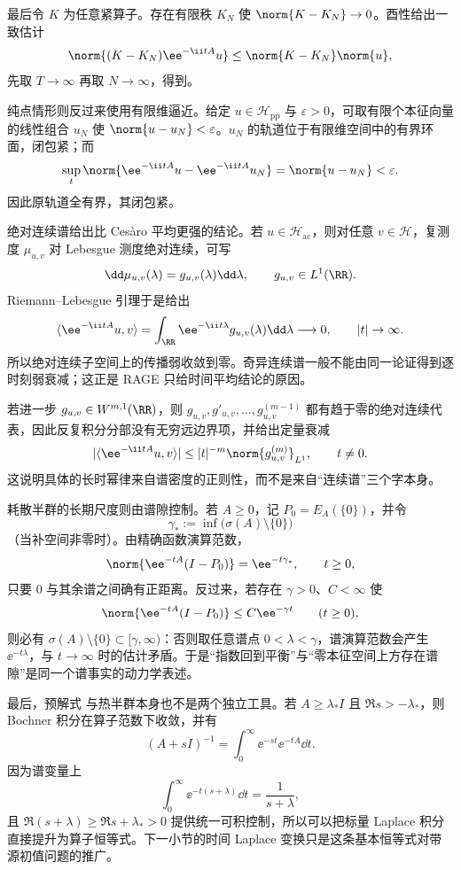 最后令 $K$ 为任意紧算子。存在有限秩 $K_N$ 使 $\norm{K-K_N}\to0$。酉性给出一致估计
\[
 \norm{(K-K_N)\ee^{-\ii tA}u}
 \le\norm{K-K_N}\norm{u},
\]
先取 $T\to\infty$ 再取 $N\to\infty$，得到。

纯点情形则反过来使用有限维逼近。给定 $u\in\mathcal H_{\mathrm{pp}}$ 与 $\varepsilon>0$，可取有限个本征向量的线性组合 $u_N$ 使
$\norm{u-u_N}<\varepsilon$。$u_N$ 的轨道位于有限维空间中的有界环面，闭包紧；而
\[
 \sup_t\norm{\ee^{-\ii tA}u-\ee^{-\ii tA}u_N}
 =\norm{u-u_N}<\varepsilon.
\]
因此原轨道全有界，其闭包紧。

绝对连续谱给出比 Ces\`aro 平均更强的结论。若 $u\in\mathcal H_{\mathrm{ac}}$，则对任意 $v\in\mathcal H$，复测度 $\mu_{u,v}$ 对 Lebesgue 测度绝对连续，可写
\[
 \dd\mu_{u,v}(\lambda)=g_{u,v}(\lambda)\dd\lambda,
 \qquad g_{u,v}\in L^1(\RR).
\]
Riemann--Lebesgue 引理于是给出
\begin{equation*}\langle\ee^{-\ii tA}u,v\rangle
 =\int_{\RR}\ee^{-\ii t\lambda}g_{u,v}(\lambda)\dd\lambda
 \longrightarrow0,
 \qquad |t|\to\infty.
\end{equation*}
所以绝对连续子空间上的传播弱收敛到零。奇异连续谱一般不能由同一论证得到逐时刻弱衰减；这正是 RAGE 只给时间平均结论的原因。

若进一步 $g_{u,v}\in W^{m,1}(\RR)$，则 $g_{u,v},g'_{u,v},\ldots,g_{u,v}^{(m-1)}$ 都有趋于零的绝对连续代表，因此反复积分分部没有无穷远边界项，并给出定量衰减
\begin{equation*}|\langle\ee^{-\ii tA}u,v\rangle|
 \le |t|^{-m}\norm{g_{u,v}^{(m)}}_{L^1},
 \qquad t\ne0.
\end{equation*}
这说明具体的长时幂律来自谱密度的正则性，而不是来自“连续谱”三个字本身。

耗散半群的长期尺度则由谱隙控制。若 $A\ge0$，记 $P_0=E_A(\{0\})$，并令
\[
 \gamma_*:=\inf\bigl(\sigma(A)\setminus\{0\}\bigr)
\]
（当补空间非零时）。由精确函数演算范数，
\begin{equation*}\norm{\ee^{-tA}(I-P_0)}
 =\ee^{-t\gamma_*},\qquad t\ge0,
\end{equation*}
只要 $0$ 与其余谱之间确有正距离。反过来，若存在 $\gamma>0$、$C<\infty$ 使
\[
 \norm{\ee^{-tA}(I-P_0)}\le C\ee^{-\gamma t}
 \qquad(t\ge0),
\]
则必有 $\sigma(A)\setminus\{0\}\subset[\gamma,\infty)$：否则取任意谱点 $0<\lambda<\gamma$，谱演算范数会产生 $\ee^{-t\lambda}$，与 $t\to\infty$ 时的估计矛盾。于是“指数回到平衡”与“零本征空间上方存在谱隙”是同一个谱事实的动力学表述。

最后，预解式 与热半群本身也不是两个独立工具。若 $A\ge\lambda_*I$ 且 $\Re s>-\lambda_*$，则 Bochner 积分在算子范数下收敛，并有
\begin{equation*}(A+sI)^{-1}
 =\int_0^\infty\ee^{-st}\ee^{-tA}\dd t.
\end{equation*}
因为谱变量上
\[
 \int_0^\infty\ee^{-t(s+\lambda)}\dd t=\frac1{s+\lambda},
\]
且 $\Re(s+\lambda)\ge\Re s+\lambda_*>0$ 提供统一可积控制，所以可以把标量 Laplace 积分直接提升为算子恒等式。下一小节的时间 Laplace 变换只是这条基本恒等式对带源初值问题的推广。

